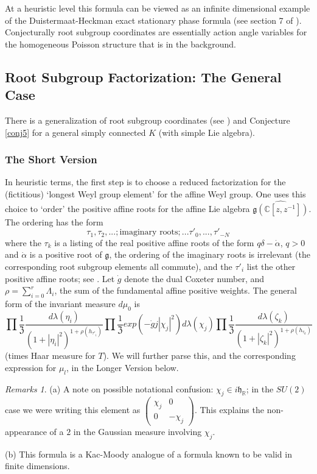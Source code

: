 \documentclass{amsart}
\theoremstyle{conjecture}
\theoremstyle{definition}
\theoremstyle{question}
\theoremstyle{questions}
\theoremstyle{remark}
\theoremstyle{remarks}
\newtheorem*{remarks}{Remarks}
\theoremstyle{example}
\numberwithin{equation}{section}
\begin{document}
At a heuristic level this formula can be viewed as an infinite dimensional example of
the Duistermaat-Heckman exact stationary phase formula (see
section 7 of \cite{Pi2}). Conjecturally root subgroup coordinates are
essentially action angle variables for the homogeneous Poisson structure
that is in the background.

\subsection{Root Subgroup Factorization: The General Case}


There is a generalization of root subgroup coordinates (see \cite{PP}) and Conjecture \ref{conj5} for a general
simply connected $K$ (with simple Lie algebra).

\subsubsection{The Short Version}\label{shortversion}
In heuristic terms, the first step is to choose
a reduced factorization for the (fictitious) `longest Weyl group element' for the affine Weyl group. One uses this choice to `order' the positive affine
roots for the affine Lie algebra $\widehat{ \mathfrak g(\mathbb C[z,z^{-1}])}$. The ordering has the form
$$\tau_1,\tau_2,...; \text{imaginary roots}; ... \tau'_0,...,\tau'_{-N} $$
where the $\tau_k$ is a listing of the real positive affine roots of the form $q\delta-\dot{\alpha}$, $q>0$ and $\dot{\alpha}$ is a positive root of $\mathfrak g$, the ordering of the imaginary roots is irrelevant (the corresponding root subgroup elements all commute), and the $\tau'_i$ list the other positive affine roots; see \cite{PP}. Let $\dot g$ denote the dual Coxeter number, and $\rho=\sum_{i=0}^{r}\Lambda_i$, the sum of the fundamental affine positive weights. The general form of the invariant measure $d\mu_0$ is
\begin{equation}\label{productmeasure2}\prod\frac{1}{\mathfrak Z} \frac{d\lambda(\eta_i)}{(1+|\eta_i|^2)^{1+\rho(h_{\tau'_i})}}  \prod \frac{1}{\mathfrak Z} exp(- \dot g j|\chi_j|^2  )d\lambda(\chi_j)  \prod\frac{1}{\mathfrak Z} \frac{d\lambda(\zeta_k)}{(1+|\zeta_k|^2)^{1+\rho(h_{\tau_k})}} \end{equation}
(times Haar measure for $T$). We will further parse this, and the corresponding expression for $\mu_l$, in
the Longer Version below.

\begin{remarks} (a) A note on possible notational confusion: $\chi_j\in i\mathfrak h_{\mathbb R}$; in the $SU(2)$ case we were writing this element as $\left(\begin{matrix}\chi_j&0\\0&-\chi_j\end{matrix}\right)$.
This explains the non-appearance of a $2$ in the Gaussian measure involving $\chi_j$.

(b) This formula is a Kac-Moody analogue of a formula known to be valid in finite dimensions.\end{remarks}
\end{document}

